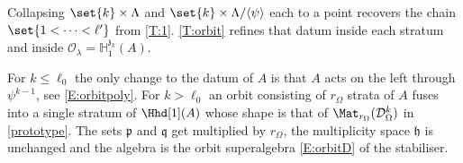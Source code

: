 \documentclass[a4paper,11pt]{amsart}
\numberwithin{equation}{subsection}
\theoremstyle{definition}
\theoremstyle{theorem}
\theoremstyle{remark}
\newcommand\CO{\mathcal{O}}
\newcommand\kapp{{\mathfrak{z}}}
\newcommand\Olam[1][\lambda]{\CO_{#1}}
\newcommand\HH{\mathbb{H}}
\begin{document}
\begin{Remark} Collapsing $\set{k}\times\Lambda$ and $\set{k}\times\Lambda/\langle\psi\rangle$
each to a point recovers the chain $\set{1<\dots<\ell'}$ from \autoref{T:1}.
\autoref{T:orbit} refines that datum inside each stratum and inside
$\Olam=\HH^{\kapp_k}_1(A)$.

For $k\leq \ell_0$ the only change to the datum of $A$ is that $A$
acts on the left through $\psi^{k-1}$, see \autoref{E:orbitpoly}.
For $k>\ell_0$ an orbit consisting of $r_\Omega$ strata of $A$ fuses into a single
stratum of $\Hhd[1](A)$ whose shape is that of
$\Mat_{r_\Omega}(\mathcal{D}^{k}_\Omega)$ in \autoref{prototype}. The sets
$\mathfrak p$ and $\mathfrak q$ get multiplied by $r_\Omega$, the
multiplicity space $\mathfrak h$ is unchanged and the algebra is the
orbit superalgebra \autoref{E:orbitD} of the stabiliser.
\end{Remark}
\end{document}

